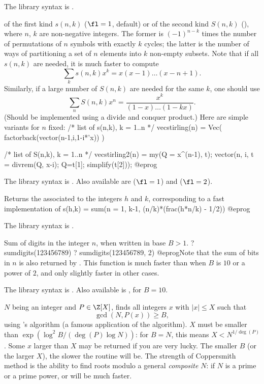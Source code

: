 The library syntax is .

\label{se:stirling}
 of the first kind $s(n,k)$ ($\fl=1$, default) or
of the second kind $S(n,k)$ (), where $n$, $k$ are non-negative
integers. The former is $(-1)^{n-k}$ times the
number of permutations of $n$ symbols with exactly $k$ cycles; the latter is
the number of ways of partitioning a set of $n$ elements into $k$ non-empty
subsets. Note that if all $s(n,k)$ are needed, it is much faster to compute
$$\sum_k s(n,k) x^k = x(x-1)\dots(x-n+1).$$
Similarly, if a large number of $S(n,k)$ are needed for the same $k$,
one should use
$$\sum_n S(n,k) x^n = \dfrac{x^k}{(1-x)\dots(1-kx)}.$$
(Should be implemented using a divide and conquer product.) Here are
simple variants for $n$ fixed:
\bprog
/* list of s(n,k), k = 1..n */
vecstirling(n) = Vec( factorback(vector(n-1,i,1-i*'x)) )

/* list of S(n,k), k = 1..n */
vecstirling2(n) =
{ my(Q = x^(n-1), t);
  vector(n, i, t = divrem(Q, x-i); Q=t[1]; simplify(t[2]));
}
@eprog

The library syntax is .
Also available are 
($\fl=1$) and  ($\fl=2$).

\label{se:sumdedekind}
Returns the  associated to the integers $h$ and $k$,
 corresponding to a fast implementation of
 \bprog
  s(h,k) = sum(n = 1, k-1, (n/k)*(frac(h*n/k) - 1/2))
 @eprog

The library syntax is .

\label{se:sumdigits}
Sum of digits in the integer $n$, when written in base $B > 1$.
\bprog
? sumdigits(123456789)
? sumdigits(123456789, 2)
@eprog\noindent Note that the sum of bits in $n$ is also returned by
. This function is much faster than
 when $B$ is $10$ or a power of $2$, and only
slightly faster in other cases.

The library syntax is .
Also available is , for $B = 10$.

\label{se:zncoppersmith}
$N$ being an integer and $P\in \Z[X]$, finds all integers $x$ with
$|x| \leq X$ such that
$$\gcd(N, P(x)) \geq B,$$
using 's algorithm (a famous application of the 
algorithm). $X$ must be smaller than $\exp(\log^2 B / (\deg(P) \log N))$:
for $B = N$, this means $X < N^{1/\deg(P)}$. Some $x$ larger than $X$ may
be returned if you are very lucky. The smaller $B$ (or the larger $X$), the
slower the routine will be. The strength of Coppersmith method is the
ability to find roots modulo a general \emph{composite} $N$: if $N$ is a prime
or a prime power,  or  will be much
faster.

